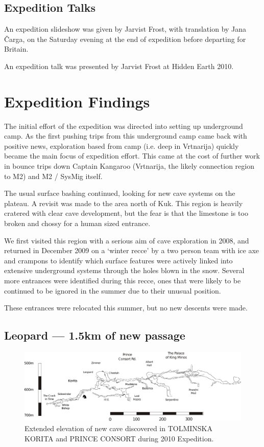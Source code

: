 \subsection{Expedition Talks}

An expedition slideshow was given by Jarvist Frost, with translation by Jana
\v{C}arga, on the Saturday evening at the end of expedition before departing
for Britain.

An expedition talk was presented by Jarvist Frost at Hidden Earth 2010.

\section{Expedition Findings}

The initial effort of the expedition was directed into setting up underground
camp. As the first pushing trips from this underground camp came back with
positive news, exploration based from camp (i.e. deep in Vrtnarija) quickly
became the main focus of expedition effort. This came at the cost of further
work in bounce trips down Captain Kangaroo (Vrtnarija, the likely connection
region to M2) and M2 / SysMig itself. 

The usual surface bashing continued, looking for new cave systems on the
plateau. A revisit was made to the area north of Kuk. This region is heavily
cratered with clear cave development, but the fear is that the limestone is too
broken and chossy for a human sized entrance. 

We first visited this region with a serious aim of cave exploration in 2008,
and returned in December 2009 on a `winter recce' by a two person team with ice
axe and crampons to identify which surface features were actively linked into
extensive underground systems through the holes blown in the snow. Several more
entrances were identified during this recce, ones that were likely to be
continued to be ignored in the summer due to their unusual position.

These entrances were relocated this summer, but no new descents were made.

\subsection{Leopard --- 1.5km of new passage}

\begin{figure}[!h]
\centering
\includegraphics[width=0.9\columnwidth]{2010/expo_findings/2010_new_stuff_extended_extraction.pdf}
\caption{Extended elevation of new cave discovered in \textsc{TOLMINSKA KORITA} and \textsc{PRINCE
CONSORT} during 2010 Expedition.}
\end{figure}

